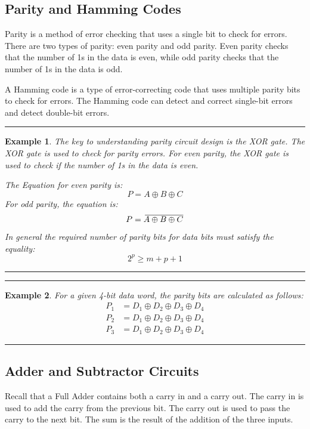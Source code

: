 \documentclass[12pt]{article}
\newtheorem{example}{Example}
\newenvironment{examp}
{
    \vspace{0.5cm}
    \hrule
    \begin{example}\upshape
}
{
    \end{example}
    \hrule
    \vspace{0.5cm}
}
\newcommand{\closure}[2][3]{%
	{}\mkern#1mu\overline{\mkern-#1mu#2}}
\begin{document}
\subsection{Parity and Hamming Codes}
Parity is a method of error checking that uses a single bit to check for errors.
There are two types of parity: even parity and odd parity. Even parity checks
that the number of 1s in the data is even, while odd parity checks that the
number of 1s in the data is odd.

A Hamming code is a type of error-correcting code that uses multiple parity bits
to check for errors. The Hamming code can detect and correct single-bit errors
and detect double-bit errors.

\begin{examp}
	The key to understanding parity circuit design is the XOR gate. The
	XOR gate is used to check for parity errors. For even parity, the XOR
	gate is used to check if the number of 1s in the data is even.

	\noindent The Equation for even parity is:
	\[
		P = A \oplus B \oplus C
	\]
	For odd parity, the equation is:
	\[
		P = \closure{A \oplus B \oplus C}
	\]
	In general the required number of parity bits for data bits must satisfy
	the equality:
	\[
		2^p \geq m + p + 1
	\]
\end{examp}
\begin{examp}
	For a given 4-bit data word, the parity bits are calculated as follows:
	\begin{align*}
		P_1 & = D_1 \oplus D_2 \oplus D_3 \oplus D_4 \\
		P_2 & = D_1 \oplus D_2 \oplus D_3 \oplus D_4 \\
		P_3 & = D_1 \oplus D_2 \oplus D_3 \oplus D_4
	\end{align*}
\end{examp}
\subsection{Adder and Subtractor Circuits}
Recall that a Full Adder contains both a carry in and a carry out. The carry in
is used to add the carry from the previous bit. The carry out is used to pass
the carry to the next bit. The sum is the result of the addition of the three
inputs.
\end{document}
